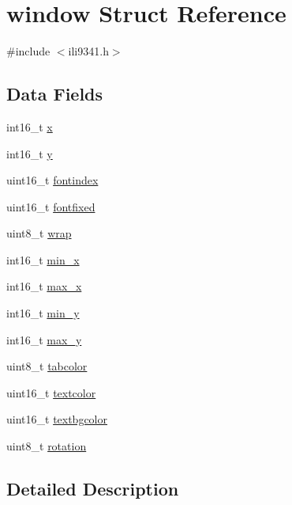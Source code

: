 \hypertarget{structwindow}{\section{window Struct Reference}
\label{structwindow}
}


{\ttfamily \#include $<$ili9341.\-h$>$}

\subsection*{Data Fields}
\begin{DoxyCompactItemize}
\item 
int16\-\_\-t \hyperlink{structwindow_a879b99940dfc34772f0257f54c67b817}{x}
\item 
int16\-\_\-t \hyperlink{structwindow_a95c7023fc42e79ab42c291b90a490776}{y}
\item 
uint16\-\_\-t \hyperlink{structwindow_a00da6dceaca10739712164daaa08a2dd}{fontindex}
\item 
uint16\-\_\-t \hyperlink{structwindow_a5afd09eaf1e9c22fa611f0f529177ac9}{fontfixed}
\item 
uint8\-\_\-t \hyperlink{structwindow_aee853dc29d3cf708890faff063ce9afb}{wrap}
\item 
int16\-\_\-t \hyperlink{structwindow_ad6317eef8afe6cee398bfaae876f8a1d}{min\-\_\-x}
\item 
int16\-\_\-t \hyperlink{structwindow_affe3812cbf97934375f43e82fdd76166}{max\-\_\-x}
\item 
int16\-\_\-t \hyperlink{structwindow_a33d39097fba2f3267bb0c003e88f4cd8}{min\-\_\-y}
\item 
int16\-\_\-t \hyperlink{structwindow_a84f9c809e082563b33f845f3b1da9bf3}{max\-\_\-y}
\item 
uint8\-\_\-t \hyperlink{structwindow_a8cf49b061febfaaaf9a52793e80d4796}{tabcolor}
\item 
uint16\-\_\-t \hyperlink{structwindow_aca878bb381210ef2ef8d764d08b126ae}{textcolor}
\item 
uint16\-\_\-t \hyperlink{structwindow_ae49a3c2629ffa093e60edc3f9e9e0917}{textbgcolor}
\item 
uint8\-\_\-t \hyperlink{structwindow_afbd48ebcb41e68d0f458dac593578aa8}{rotation}
\end{DoxyCompactItemize}


\subsection{Detailed Description}


